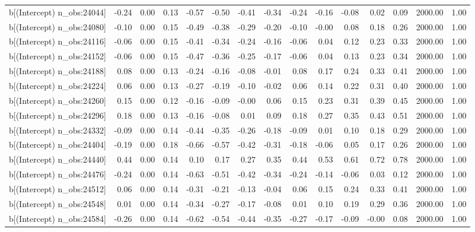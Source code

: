 \begin{table}[ht]
\begin{tabular}{rrrrrrrrrrrrrrr}
  b[(Intercept) n\_obs:24044] & -0.24 & 0.00 & 0.13 & -0.57 & -0.50 & -0.41 & -0.34 & -0.24 & -0.16 & -0.08 & 0.02 & 0.09 & 2000.00 & 1.00 \\ 
  b[(Intercept) n\_obs:24080] & -0.10 & 0.00 & 0.15 & -0.49 & -0.38 & -0.29 & -0.20 & -0.10 & -0.00 & 0.08 & 0.18 & 0.26 & 2000.00 & 1.00 \\ 
  b[(Intercept) n\_obs:24116] & -0.06 & 0.00 & 0.15 & -0.41 & -0.34 & -0.24 & -0.16 & -0.06 & 0.04 & 0.12 & 0.23 & 0.33 & 2000.00 & 1.00 \\ 
  b[(Intercept) n\_obs:24152] & -0.06 & 0.00 & 0.15 & -0.47 & -0.36 & -0.25 & -0.17 & -0.06 & 0.04 & 0.13 & 0.23 & 0.34 & 2000.00 & 1.00 \\ 
  b[(Intercept) n\_obs:24188] & 0.08 & 0.00 & 0.13 & -0.24 & -0.16 & -0.08 & -0.01 & 0.08 & 0.17 & 0.24 & 0.33 & 0.41 & 2000.00 & 1.00 \\ 
  b[(Intercept) n\_obs:24224] & 0.06 & 0.00 & 0.13 & -0.27 & -0.19 & -0.10 & -0.02 & 0.06 & 0.14 & 0.22 & 0.31 & 0.40 & 2000.00 & 1.00 \\ 
  b[(Intercept) n\_obs:24260] & 0.15 & 0.00 & 0.12 & -0.16 & -0.09 & -0.00 & 0.06 & 0.15 & 0.23 & 0.31 & 0.39 & 0.45 & 2000.00 & 1.00 \\ 
  b[(Intercept) n\_obs:24296] & 0.18 & 0.00 & 0.13 & -0.16 & -0.08 & 0.01 & 0.09 & 0.18 & 0.27 & 0.35 & 0.43 & 0.51 & 2000.00 & 1.00 \\ 
  b[(Intercept) n\_obs:24332] & -0.09 & 0.00 & 0.14 & -0.44 & -0.35 & -0.26 & -0.18 & -0.09 & 0.01 & 0.10 & 0.18 & 0.29 & 2000.00 & 1.00 \\ 
  b[(Intercept) n\_obs:24404] & -0.19 & 0.00 & 0.18 & -0.66 & -0.57 & -0.42 & -0.31 & -0.18 & -0.06 & 0.05 & 0.17 & 0.26 & 2000.00 & 1.00 \\ 
  b[(Intercept) n\_obs:24440] & 0.44 & 0.00 & 0.14 & 0.10 & 0.17 & 0.27 & 0.35 & 0.44 & 0.53 & 0.61 & 0.72 & 0.78 & 2000.00 & 1.00 \\ 
  b[(Intercept) n\_obs:24476] & -0.24 & 0.00 & 0.14 & -0.63 & -0.51 & -0.42 & -0.34 & -0.24 & -0.14 & -0.06 & 0.03 & 0.12 & 2000.00 & 1.00 \\ 
  b[(Intercept) n\_obs:24512] & 0.06 & 0.00 & 0.14 & -0.31 & -0.21 & -0.13 & -0.04 & 0.06 & 0.15 & 0.24 & 0.33 & 0.41 & 2000.00 & 1.00 \\ 
  b[(Intercept) n\_obs:24548] & 0.01 & 0.00 & 0.14 & -0.34 & -0.27 & -0.17 & -0.08 & 0.01 & 0.10 & 0.19 & 0.29 & 0.36 & 2000.00 & 1.00 \\ 
  b[(Intercept) n\_obs:24584] & -0.26 & 0.00 & 0.14 & -0.62 & -0.54 & -0.44 & -0.35 & -0.27 & -0.17 & -0.09 & -0.00 & 0.08 & 2000.00 & 1.00 \\ 

\end{tabular}
\end{table}
